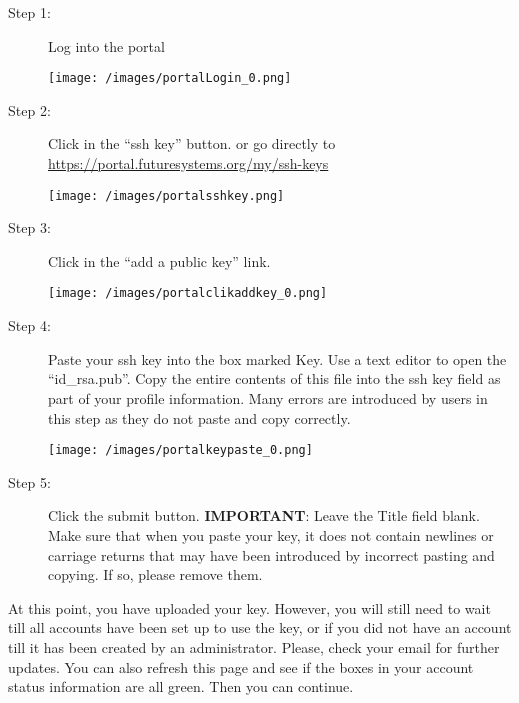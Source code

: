 \begin{description}

\item[Step 1:] Log into the portal \medskip

\begin{center}
\texttt{[image: /images/portalLogin\_0.png]}
\end{center}

\item[Step 2:] Click in the ``ssh key'' button. or go directly to
  \url{https://portal.futuresystems.org/my/ssh-keys} \medskip

\begin{center}
\texttt{[image: /images/portalsshkey.png]}
\end{center}

\item[Step 3:] Click in the ``add a public key'' link.  \medskip

\begin{center}
\texttt{[image: /images/portalclikaddkey\_0.png]}
\end{center}

\item[Step 4:] Paste your ssh key into the box marked Key. Use a text
  editor to open the ``id\_rsa.pub''. Copy the entire contents of this
  file into the ssh key field as part of your profile
  information. Many errors are introduced by users in this step as
  they do not paste and copy correctly.  \medskip

\begin{center}
\texttt{[image: /images/portalkeypaste\_0.png]}
\end{center}

\item[Step 5:] Click the submit button. \textbf{IMPORTANT}: Leave the
  Title field blank.  Make sure that when you paste your key, it does
  not contain newlines or carriage returns that may have been
  introduced by incorrect pasting and copying. If so, please remove
  them.

\end{description}

At this point, you have uploaded your key. However, you will still need
to wait till all accounts have been set up to use the key, or if you did
not have an account till it has been created by an administrator.
Please, check your email for further updates. You can also refresh this
page and see if the boxes in your account status information are all
green. Then you can continue.

